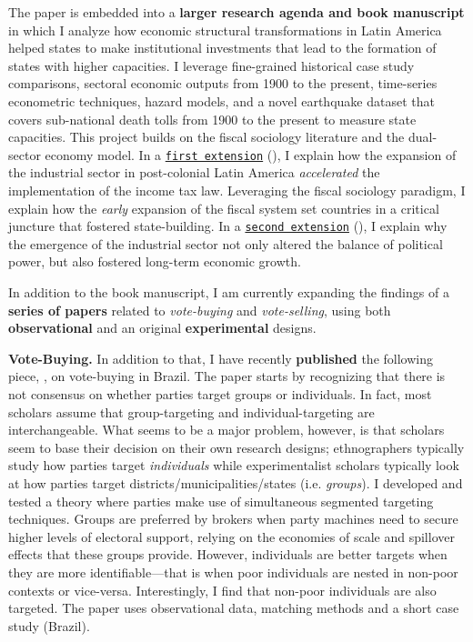 The paper is embedded into a {\bf larger research agenda and book manuscript} in which I analyze how economic structural transformations in Latin America helped states to make institutional investments that lead to the formation of states with higher capacities. I leverage fine-grained historical case study comparisons, sectoral economic outputs from 1900 to the present, time-series econometric techniques, hazard models, and a novel earthquake dataset that covers sub-national death tolls from 1900 to the present to measure state capacities. This project builds on the fiscal sociology literature and the dual-sector economy model. In a \href{http://github.com/hbahamonde/IncomeTaxAdoption/raw/master/Bahamonde_IncomeTaxAdoption.pdf}{\texttt{first extension}} (\emph{\unskip}), I explain how the expansion of the industrial sector in post-colonial Latin America \emph{accelerated} the implementation of the income tax law. Leveraging the fiscal sociology paradigm, I explain how the \emph{early} expansion of the fiscal system set countries in a critical juncture that fostered state-building. In a \href{https://github.com/hbahamonde/Negative_Link_Paper/raw/master/Bahamonde_NegativeLink.pdf}{\texttt{second extension}} (\emph{\unskip}), I explain why the emergence of the industrial sector not only altered the balance of political power, but also fostered long-term economic growth. 

In addition to the book manuscript, I am currently expanding the findings of a {\bf series of papers} related to \emph{vote-buying} and \emph{vote-selling}, using both {\bf observational} and an original {\bf experimental} designs. 


{\bf Vote-Buying.} In addition to that, I have recently {\bf published} the following piece, \emph{\unskip}, on vote-buying in Brazil. The paper starts by recognizing that there is not consensus on whether parties target groups or individuals. In fact, most scholars assume that group-targeting and individual-targeting are interchangeable. What seems to be a major problem, however, is that scholars seem to base their decision on their own research designs; ethnographers typically study how parties target \emph{individuals} while experimentalist scholars typically look at how parties target districts/municipalities/states (i.e. \emph{groups}). I developed and tested a theory where parties make use of simultaneous segmented targeting techniques. Groups are preferred by brokers when party machines need to secure higher levels of electoral support, relying on the economies of scale and spillover effects that these groups provide. However, individuals are better targets when they are more identifiable---that is when poor individuals are nested in non-poor contexts or vice-versa. Interestingly, I find that non-poor individuals are also targeted. The paper uses observational data, matching methods and a short case study (Brazil).


